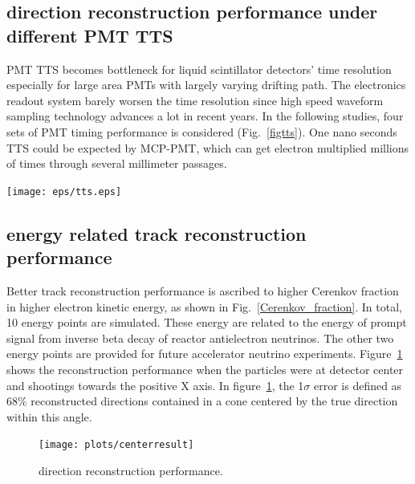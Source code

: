 \documentclass[a4paper,10pt]{cpc-hepnp}
\begin{document}
\subsection{direction reconstruction performance under different PMT TTS}
PMT TTS becomes bottleneck for liquid scintillator detectors' time resolution
especially for large area PMTs with largely varying drifting path. The
electronics readout system barely worsen the time resolution
since high speed waveform sampling technology advances a lot in
recent years. In the following studies, four sets of PMT timing performance
is considered (Fig.~\ref{figtts}). One nano seconds TTS could be expected by
MCP-PMT, which can get electron multiplied millions of times through several
millimeter passages.
\begin{center}
\texttt{[image: eps/tts.eps]}
\end{center}
\subsection{energy related track reconstruction performance}
Better track reconstruction performance is ascribed to higher Cerenkov fraction 
in higher electron kinetic energy, as shown in Fig.~\ref{Cerenkov_fraction}. 
In total, 10 energy points are simulated. These energy are related to the
energy of prompt signal from inverse beta decay of reactor antielectron neutrinos.
The other two  energy points are provided for future accelerator neutrino experiments.
Figure~\ref{rec_performance} shows the
reconstruction performance when the particles were at detector center and
shootings towards the positive X axis. 
In figure~\ref{rec_performance}, the 1$\sigma$ error is defined as 68\% reconstructed
directions contained in a cone centered by the true direction within this angle.
\begin{figure}[htbp]
\centering %
\texttt{[image: plots/centerresult]}
\caption{\label{rec_performance} direction reconstruction performance.}
\end{figure}
\end{document}
